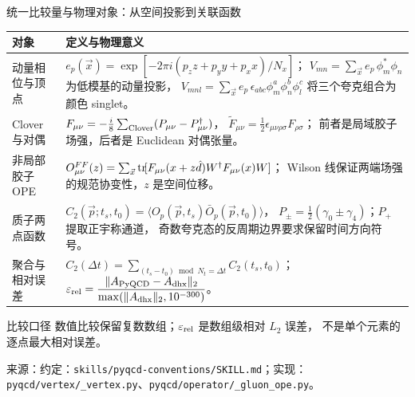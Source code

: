\documentclass[UTF8,aspectratio=169,11pt]{ctexbeamer}
\newcommand{\source}[1]{\vspace{0.05em}\par{\raggedright\scriptsize\color{muted}来源：#1\par}}
\newcommand{\codepath}[1]{\nolinkurl{#1}}
\begin{document}
\begin{frame}[t]{统一比较量与物理对象：从空间投影到关联函数}
  \footnotesize
  \begin{tabularx}{0.96\textwidth}{@{}L Y@{}}
    \toprule
    对象 & 定义与物理意义 \\
    \midrule
    动量相位与顶点 &
      $e_p(\vec x)=\exp[-2\pi i(p_z z+p_y y+p_x x)/N_x]$；
      $V_{mn}=\sum_{\vec x}e_p\,\phi_m^*\phi_n$ 为低模基的动量投影，
      $V_{mnl}=\sum_{\vec x}e_p\,\epsilon_{abc}\phi_m^a\phi_n^b\phi_l^c$
      将三个夸克组合为颜色 singlet。 \\
    Clover 与对偶 &
      $F_{\mu\nu}=-\frac{i}{8}\sum_{\rm Clover}(P_{\mu\nu}-P_{\mu\nu}^{\dagger})$，
      $\widetilde F_{\mu\nu}=\frac12\epsilon_{\mu\nu\rho\sigma}F_{\rho\sigma}$；
      前者是局域胶子场强，后者是 Euclidean 对偶张量。 \\
    非局部胶子 OPE &
      $O^{FF}_{\mu\nu}(z)=\sum_{\vec x}{\rm tr}\!
      [F_{\mu\nu}(x+z\hat d)W^\dagger F_{\mu\nu}(x)W]$；
      Wilson 线保证两端场强的规范协变性，$z$ 是空间位移。 \\
    质子两点函数 &
      $C_2(\vec p;t_s,t_0)=\langle O_p(\vec p,t_s)\bar O_p(\vec p,t_0)\rangle$，
      $P_\pm=\frac12(\gamma_0\pm\gamma_4)$；$P_+$ 提取正宇称通道，
      奇数夸克态的反周期边界要求保留时间方向符号。 \\
    聚合与相对误差 &
      $C_2(\Delta t)=\sum_{(t_s-t_0)\bmod N_t=\Delta t}C_2(t_s,t_0)$；
      $\displaystyle\varepsilon_{\rm rel}=\frac{\|A_{\rm PyQCD}-A_{\rm dhx}\|_2}
      {\max(\|A_{\rm dhx}\|_2,10^{-300})}$。 \\
    \bottomrule
  \end{tabularx}
  \vspace{0.12em}
  \begin{block}{比较口径}
    数值比较保留复数数组；$\varepsilon_{\rm rel}$ 是数组级相对 $L_2$ 误差，
    不是单个元素的逐点最大相对误差。
  \end{block}
  \source{约定：\codepath{skills/pyqcd-conventions/SKILL.md}；实现：\codepath{pyqcd/vertex/_vertex.py}、\codepath{pyqcd/operator/_gluon_ope.py}。}
\end{frame}
\end{document}
